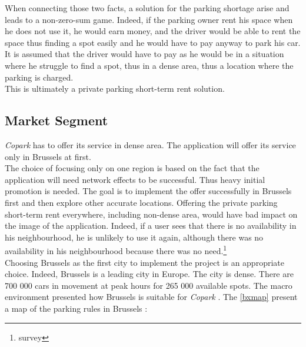 \documentclass[12pt,a4paper,oneside]{book}
\newcommand{\bp}{\textit{Copark }}
\begin{document}
When connecting those two facts, a solution for the parking shortage arise and leads to a non-zero-sum game. Indeed, if the parking owner rent his space when he does not use it, he would earn money, and the driver would be able to rent the space thus finding a spot easily and he would have to pay anyway to park his car. It is assumed that the driver would have to pay as he would be in a situation where he struggle to find a spot, thus in a dense area, thus a location where the parking is charged.\\

This is ultimately a private parking short-term rent solution.

\subsection{Market Segment}
\bp has to offer its service in dense area. The application will offer its service only in Brussels at first.\\

The choice of focusing only on one region is based on the fact that the application will need network effects to be successful. Thus heavy initial promotion is needed. The goal is to implement the offer successfully in Brussels first and then explore other accurate locations. Offering the private parking short-term rent everywhere, including non-dense area, would have bad impact on the image of the application. Indeed, if a user sees that there is no availability in his neighbourhood, he is unlikely to use it again, although there was no availability in his neighbourhood because there was no need.\footnote{survey} \\

Choosing Brussels as the first city to implement the project is an appropriate choice. Indeed, Brussels is a leading city in Europe. The city is dense. There are 700 000 cars in movement at peak hours for 265 000 available spots.\cite{parkbx} The macro environment presented how Brussels is suitable for \bp. The \autoref{bxmap} present a map of the parking rules in Brussels\cite{parkbx} : \\
\end{document}
